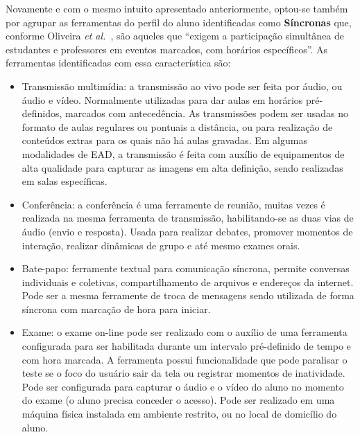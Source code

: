 Novamente e com o mesmo intuito apresentado anteriormente, optou-se também por agrupar as ferramentas do perfil do aluno identificadas como \textbf{Síncronas} que, conforme Oliveira \textit{et al.}~\cite{dotta@ead}, são aqueles que ``exigem a participação simultânea de estudantes e professores em eventos marcados, com horários específicos''. As ferramentas identificadas com essa característica são:
\label{sub:sinc}

\begin{itemize}
\item Transmissão multimídia: a transmissão ao vivo pode ser feita por áudio, ou áudio e vídeo. Normalmente utilizadas para dar aulas em horários pré-definidos, marcados com antecedência. As transmissões podem ser usadas no formato de aulas regulares ou pontuais a distância, ou para realização de conteúdos extras para os quais não há aulas gravadas. Em algumas modalidades de EAD, a transmissão é feita com auxílio de equipamentos de alta qualidade para capturar as imagens em alta definição, sendo realizadas em salas específicas.
\item Conferência: a conferência é uma ferramente de reunião, muitas vezes é realizada na mesma ferramenta de transmissão, habilitando-se as duas vias de áudio (envio e resposta). Usada para realizar debates, promover momentos de interação, realizar dinâmicas de grupo e até mesmo exames orais.
\item Bate-papo: ferramente textual para comunicação síncrona, permite conversas individuais e coletivas, compartilhamento de arquivos e endereços da internet. Pode ser a mesma ferramente de troca de mensagens sendo utilizada de forma síncrona com marcação de hora para iniciar.
\item Exame: o exame on-line pode ser realizado com o auxílio de uma ferramenta configurada para ser habilitada durante um intervalo pré-definido de tempo e com hora marcada. A ferramenta possui funcionalidade que pode paralisar o teste se o foco do usuário sair da tela ou registrar momentos de inatividade. Pode ser configurada para capturar o áudio e o vídeo do aluno no momento do exame (o aluno precisa conceder o acesso). Pode ser realizado em uma máquina física instalada em ambiente restrito, ou no local de domicílio do aluno.
\end{itemize}

